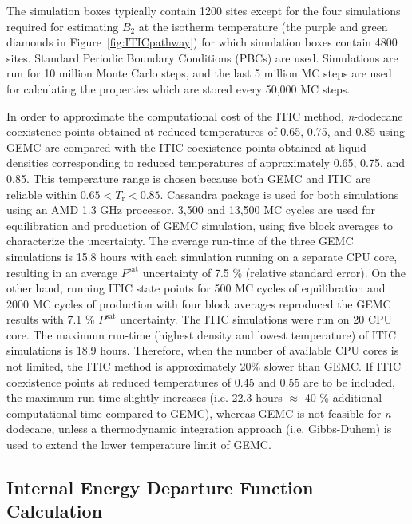 \documentclass[5p,times]{elsarticle}
\begin{document}
The simulation boxes typically contain 1200 sites except for the four simulations required for estimating $B_2$ at the isotherm temperature (the purple and green diamonds in Figure~\ref{fig:ITICpathway}) for which simulation boxes contain 4800 sites. Standard Periodic Boundary Conditions (PBCs) are used. Simulations are run for 10 million Monte Carlo steps, and the last 5 million MC steps are used for calculating the properties which are stored every 50,000 MC steps. 


In order to approximate the computational cost of the ITIC method, \textit{n}-dodecane  coexistence points obtained at reduced temperatures of 0.65, 0.75, and 0.85 using  GEMC are compared with the ITIC coexistence points obtained at liquid densities corresponding to reduced temperatures of approximately 0.65, 0.75, and 0.85. This temperature range is chosen because both  GEMC and ITIC are reliable within $0.65<T_\mathrm{r}<0.85$. Cassandra package is used for both simulations using an AMD 1.3 GHz processor. 3,500 and 13,500 MC cycles are used for equilibration and production of GEMC simulation, using five block averages to characterize the uncertainty. The average run-time of the three GEMC simulations is 15.8 hours with each simulation running on a separate CPU core, resulting in an average $P^\mathrm{sat}$ uncertainty of 7.5 \% (relative standard error). On the other hand, running ITIC state points for 500 MC cycles of equilibration and 2000 MC cycles of production with four block averages reproduced the GEMC results with 7.1 \% $P^\mathrm{sat}$ uncertainty. The ITIC simulations were run on 20 CPU core. The maximum run-time (highest density and lowest temperature) of ITIC simulations is 18.9 hours. Therefore, when the number of available CPU cores is not limited, the ITIC method is approximately 20\% slower than GEMC. If ITIC coexistence points at reduced temperatures of 0.45 and 0.55 are to be included, the maximum run-time slightly increases (i.e. 22.3 hours $\approx$ 40 \% additional computational time compared to GEMC), whereas GEMC is not feasible for \textit{n}-dodecane, unless a thermodynamic integration approach (i.e. Gibbs-Duhem) is used to extend the lower temperature limit of GEMC.

\subsection{Internal Energy Departure Function Calculation}\label{sec:udepCalc}
\end{document}
